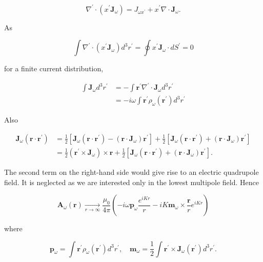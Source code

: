 \documentclass[10pt]{article}
\begin{document}
$$
\nabla^{\prime} \cdot\left(x^{\prime} \mathbf{J}_{\omega}\right)=J_{\omega x^{\prime}}+x^{\prime} \nabla \cdot \mathbf{J}_{\omega} .
$$

As

$$
\int \nabla^{\prime} \cdot\left(x^{\prime} \mathbf{J}_{\omega}\right) d^{3} r^{\prime}=\oint x^{\prime} \mathbf{J}_{\omega} \cdot d S^{\prime}=0
$$

for a finite current distribution,

$$
\begin{aligned}
\int \mathbf{J}_{\omega} d^{3} r^{\prime} &=-\int \mathbf{r}^{\prime} \nabla^{\prime} \cdot \mathbf{J}_{\omega} d^{3} r^{\prime} \\
&=-i \omega \int \mathbf{r}^{\prime} \rho_{\omega}\left(\mathbf{r}^{\prime}\right) d^{3} r^{\prime}
\end{aligned}
$$

Also

$$
\begin{aligned}
\mathbf{J}_{\omega}\left(\mathbf{r} \cdot \mathbf{r}^{\prime}\right) &=\frac{1}{2}\left[\mathbf{J}_{\omega}\left(\mathbf{r} \cdot \mathbf{r}^{\prime}\right)-\left(\mathbf{r} \cdot \mathbf{J}_{\omega}\right) \mathbf{r}^{\prime}\right]+\frac{1}{2}\left[\mathbf{J}_{\omega}\left(\mathbf{r} \cdot \mathbf{r}^{\prime}\right)+\left(\mathbf{r} \cdot \mathbf{J}_{\omega}\right) \mathbf{r}^{\prime}\right] \\
&=\frac{1}{2}\left(\mathbf{r}^{\prime} \times \mathbf{J}_{\omega}\right) \times \mathbf{r}+\frac{1}{2}\left[\mathbf{J}_{\omega}\left(\mathbf{r} \cdot \mathbf{r}^{\prime}\right)+\left(\mathbf{r} \cdot \mathbf{J}_{\omega}\right) \mathbf{r}^{\prime}\right] .
\end{aligned}
$$

The second term on the right-hand side would give rise to an electric quadrupole field. It is neglected as we are interested only in the lowest multipole field. Hence

$$
\mathbf{A}_{\omega}(\mathbf{r}) \underset{r \rightarrow \infty}{\longrightarrow} \frac{\mu_{0}}{4 \pi}\left(-i \omega \mathbf{p}_{\omega} \frac{e^{i K r}}{r}-i K \mathbf{m}_{\omega} \times \frac{\mathbf{r}}{r} e^{i K r}\right)
$$

where

$$
\mathbf{p}_{\omega}=\int \mathbf{r}^{\prime} \rho_{\omega}\left(\mathbf{r}^{\prime}\right) d^{3} r^{\prime}, \quad \mathbf{m}_{\omega}=\frac{1}{2} \int \mathbf{r}^{\prime} \times \mathbf{J}_{\omega}\left(\mathbf{r}^{\prime}\right) d^{3} r^{\prime} .
$$
\end{document}
